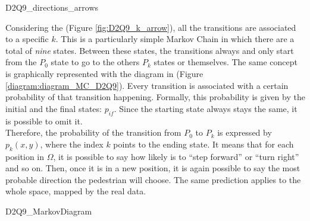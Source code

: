\documentclass[class=article, crop=false]{standalone}
\begin{document}
	{D2Q9_directions_arrows}

Considering the (Figure \ref{fig:D2Q9_k_arrow}), all the transitions are associated to a specific $k$. 
This is a particularly simple Markov Chain in which there are a total of \emph{nine} states. 
Between these states, the transitions always and only start from the $P_0$ state to go to the others $P_k$ states or themselves. 
The same concept is graphically represented with the diagram in (Figure \ref{diagram:diagram_MC_D2Q9}). 
Every transition is associated with a certain probability of that transition happening. 
Formally, this probability is given by the initial and the final states: $p_{if}$. 
Since the starting state always stays the same, it is possible to omit it. 
\\Therefore, the probability of the transition from $P_0$ to $P_k$ is expressed by $p_k(x, y)$, where the index $k$ points to the ending state. 
It means that for each position in $\Omega$, it is possible to say how likely is to “step forward” or “turn right” and so on. 
Then, once it is in a new position, it is again possible to say the most probable direction the pedestrian will choose. 
The same prediction applies to the whole space, mapped by the real data.

	{D2Q9_MarkovDiagram}
\end{document}
